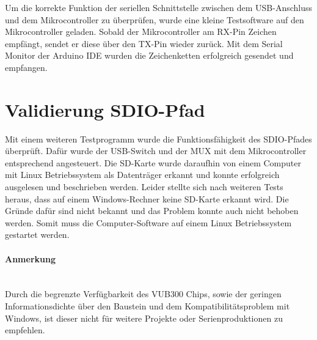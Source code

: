 Um die korrekte Funktion der seriellen Schnittstelle zwischen dem USB-Anschluss und dem Mikrocontroller zu überprüfen, wurde eine kleine Testsoftware auf den Mikrocontroller geladen. Sobald der Mikrocontroller am RX-Pin Zeichen empfängt, sendet	er diese über den TX-Pin wieder zurück. Mit dem Serial Monitor der Arduino IDE wurden die Zeichenketten erfolgreich gesendet und empfangen.

\section{Validierung SDIO-Pfad}

Mit einem weiteren Testprogramm wurde die Funktionsfähigkeit des SDIO-Pfades überprüft. Dafür wurde der USB-Switch und der MUX mit dem Mikrocontroller entsprechend angesteuert. Die SD-Karte wurde daraufhin von einem Computer mit Linux Betriebssystem als Datenträger erkannt und konnte erfolgreich ausgelesen und beschrieben werden. Leider stellte sich nach weiteren Tests heraus, dass auf einem Windows-Rechner keine SD-Karte erkannt wird. Die Gründe dafür sind nicht bekannt und das Problem konnte auch nicht behoben werden. Somit muss die Computer-Software auf einem Linux Betriebssystem gestartet werden.
\paragraph{Anmerkung}$ $\\
Durch die begrenzte Verfügbarkeit des VUB300 Chips, sowie der geringen Informationsdichte über den Baustein und dem Kompatibilitätsproblem mit Windows, ist dieser nicht für weitere Projekte oder Serienproduktionen zu empfehlen.